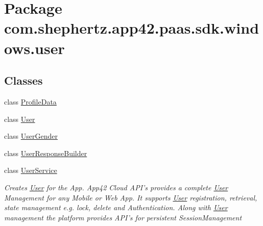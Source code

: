 \hypertarget{namespacecom_1_1shephertz_1_1app42_1_1paas_1_1sdk_1_1windows_1_1user}{\section{Package com.\+shephertz.\+app42.\+paas.\+sdk.\+windows.\+user}
\label{namespacecom_1_1shephertz_1_1app42_1_1paas_1_1sdk_1_1windows_1_1user}
}
\subsection*{Classes}
\begin{DoxyCompactItemize}
\item 
class \hyperlink{classcom_1_1shephertz_1_1app42_1_1paas_1_1sdk_1_1windows_1_1user_1_1_profile_data}{Profile\+Data}
\item 
class \hyperlink{classcom_1_1shephertz_1_1app42_1_1paas_1_1sdk_1_1windows_1_1user_1_1_user}{User}
\item 
class \hyperlink{classcom_1_1shephertz_1_1app42_1_1paas_1_1sdk_1_1windows_1_1user_1_1_user_gender}{User\+Gender}
\item 
class \hyperlink{classcom_1_1shephertz_1_1app42_1_1paas_1_1sdk_1_1windows_1_1user_1_1_user_response_builder}{User\+Response\+Builder}
\item 
class \hyperlink{classcom_1_1shephertz_1_1app42_1_1paas_1_1sdk_1_1windows_1_1user_1_1_user_service}{User\+Service}
\begin{DoxyCompactList}\small\item\em Creates \hyperlink{classcom_1_1shephertz_1_1app42_1_1paas_1_1sdk_1_1windows_1_1user_1_1_user}{User} for the App. App42 Cloud A\+P\+I's provides a complete \hyperlink{classcom_1_1shephertz_1_1app42_1_1paas_1_1sdk_1_1windows_1_1user_1_1_user}{User} Management for any Mobile or Web App. It supports \hyperlink{classcom_1_1shephertz_1_1app42_1_1paas_1_1sdk_1_1windows_1_1user_1_1_user}{User} registration, retrieval, state management e.\+g. lock, delete and Authentication. Along with \hyperlink{classcom_1_1shephertz_1_1app42_1_1paas_1_1sdk_1_1windows_1_1user_1_1_user}{User} management the platform provides A\+P\+I's for persistent Session\+Management \end{DoxyCompactList}\end{DoxyCompactItemize}
